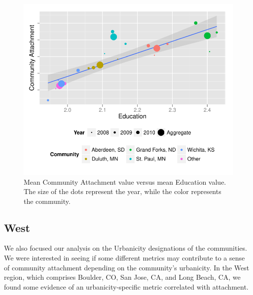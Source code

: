 \documentclass[11pt]{article}\usepackage{knitr}
\begin{document}
\begin{knitrout}
\color{fgcolor}\begin{figure}[H]


{\centering \includegraphics[width=\maxwidth]{figure/gp_two} 

}

\caption[Mean Community Attachment value versus mean Education value]{Mean Community Attachment value versus mean Education value. The size of the dots represent the year, while the color represents the community.\label{fig:gp_two}}
\end{figure}


\end{knitrout}



\subsection*{West}
We also focused our analysis on the Urbanicity designations of the communities. We were interested in seeing if some different metrics may contribute to a sense of community attachment depending on the community's urbanicity. In the West region, which comprises Boulder, CO, San Jose, CA, and Long Beach, CA, we found some evidence of an urbanicity-specific metric correlated with attachment.
\end{document}
